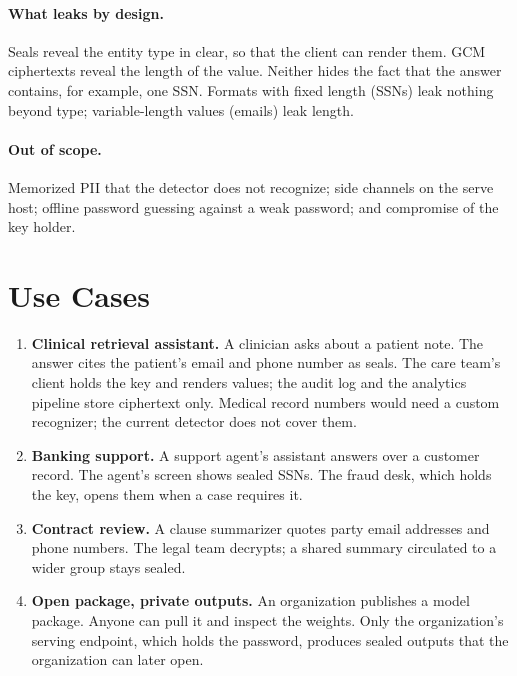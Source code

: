 \documentclass[11pt]{article}
\begin{document}
\paragraph{What leaks by design.} Seals reveal the entity type in clear, so that the client can render them. GCM ciphertexts reveal the length of the value. Neither hides the fact that the answer contains, for example, one SSN. Formats with fixed length (SSNs) leak nothing beyond type; variable-length values (emails) leak length.

\paragraph{Out of scope.} Memorized PII that the detector does not recognize; side channels on the serve host; offline password guessing against a weak password; and compromise of the key holder.

\section{Use Cases}
\label{sec:usecases}

\begin{enumerate}
  \item \textbf{Clinical retrieval assistant.} A clinician asks about a patient note. The answer cites the patient's email and phone number as seals. The care team's client holds the key and renders values; the audit log and the analytics pipeline store ciphertext only. Medical record numbers would need a custom recognizer; the current detector does not cover them.
  \item \textbf{Banking support.} A support agent's assistant answers over a customer record. The agent's screen shows sealed SSNs. The fraud desk, which holds the key, opens them when a case requires it.
  \item \textbf{Contract review.} A clause summarizer quotes party email addresses and phone numbers. The legal team decrypts; a shared summary circulated to a wider group stays sealed.
  \item \textbf{Open package, private outputs.} An organization publishes a model package. Anyone can pull it and inspect the weights. Only the organization's serving endpoint, which holds the password, produces sealed outputs that the organization can later open.
\end{enumerate}

\end{document}
